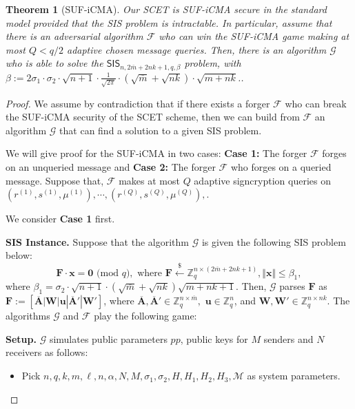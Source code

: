 \documentclass[a4paper,11pt,onecolumn]{elsarticle}
\def\bf{\mathbf}
\newtheorem{theorem}{Theorem}
\begin{document}
	\begin{theorem}[SUF-iCMA] Our \textsf{SCET} is SUF-iCMA secure in the standard model provided that the SIS problem is intractable. In particular, assume that there is an adversarial algorithm $\mathcal{F}$ who can win the SUF-iCMA  game making at most $Q<q/2$ adaptive chosen message queries. Then, there is an algorithm $\mathcal{G}$ who is able to solve the $\mathsf{SIS}_{n, 2\overline{m}+2nk+1, q, \beta}$ problem, with $ \beta:=  2\sigma_1\cdot \sigma_2\cdot \sqrt{n+1} \cdot \frac{1}{\sqrt{2\pi}}\cdot (\sqrt{\overline{m}}+\sqrt{nk}) \cdot\sqrt{m+nk}  $..
	\end{theorem}
	\begin{proof} 
	 We assume by contradiction that if there exists a forger $\mathcal{F}$ who can break the SUF-iCMA security of the \textsf{SCET} scheme, then we can build from $\mathcal{F}$ an algorithm $\mathcal{G}$ that can find a solution to a given SIS problem. %
	 
	 We will give proof for the SUF-iCMA in two cases: \textbf{Case 1:} The forger  $\mathcal{F}$ forges on an unqueried message and \textbf{Case 2:} The  forger  $\mathcal{F}$ who forges on a queried message. 
	 Suppose that, $\mathcal{F}$ makes at most $Q$ adaptive signcryption queries on $(r^{(1)},s^{(1)},\mu^{(1)}), \cdots, (r^{(Q)},s^{(Q)},\mu^{(Q)}),$.
	 
	 We consider \textbf{Case 1} first.
	 
	   \textbf{SIS Instance.} Suppose that the algorithm  $\mathcal{G}$ is given the following SIS problem below:
		\begin{equation}\label{key}
		\bf{F}\cdot \bf{x}=\bf{0} \text{ (mod } q), \text{ where } \bf{F} \xleftarrow{\$} \mathbb{Z}_q^{n \times (2\overline{m}+2nk+1)}, \Vert \textbf{x}\Vert \leq \beta_1, 
		\end{equation}
		where $\beta_1= \sigma_2 \cdot \sqrt{n+1}\cdot (\sqrt{\overline{m}}+\sqrt{nk})\sqrt{m+nk+1} $.
	Then, $\mathcal{G}$ parses $\bf{F}$ as $\bf{F}:=[\overline{\bf{A}}|\bf{W}|\textbf{u}|\overline{\bf{A}}'|\bf{W'}]$, where $\overline{\bf{A}},\overline{\bf{A}}' \in \mathbb{Z}_q^{n \times \overline{m}},$ $ \mathbf{u} \in \mathbb{Z}_q ^{n}$, and $ \mathbf{W}, \bf{W}'\in \mathbb{Z}_q^{n \times nk}$. 
		The algorithms  $\mathcal{G}$ and $\mathcal{F}$ play the following game:
		
	 \textbf{Setup.}   $\mathcal{G}$ simulates public parameters $pp$, public keys for $M$ senders and $N$ receivers as follows:
			\begin{itemize}
			\item Pick $n,q, k, m,\ell, n, \alpha,  N, M, \sigma_1, \sigma_2, H, H_1, H_2, H_3, \mathcal{M}$ as system parameters.
			

\end{itemize}
\end{proof}
\end{document}
